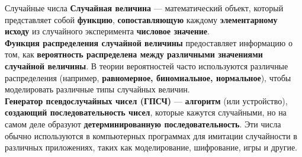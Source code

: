 \documentclass{beamer}
\begin{document}
	\begin{frame}{Случайные числа}
		\textbf{Случайная величина} --- математический объект, который представляет собой \textbf{функцию}, \textbf{сопоставляющую} каждому \textbf{элементарному исходу} из случайного эксперимента \textbf{числовое значение}.\\		
		
		\textbf{Функция распределения случайной величины} предоставляет информацию о том, как \textbf{вероятность распределена между различными значениями случайной величины}. 
		{\footnotesize
			В теории вероятностей часто используются различные распределения (например, \textbf{равномерное, биномиальное, нормальное}), чтобы моделировать различные типы случайных величин.
		}\\		
		
		\textbf{Генератор псевдослучайных чисел (ГПСЧ)} --- \textbf{алгоритм} (или устройство), \textbf{создающий последовательность чисел}, которые кажутся случайными, но на самом деле образуют \textbf{детерминированную последовательность}. 
		\footnotesize
		Эти числа обычно используются в компьютерных программах для имитации случайности в различных приложениях, таких как моделирование, шифрование, игры и другие.


	\end{frame}
\end{document}
